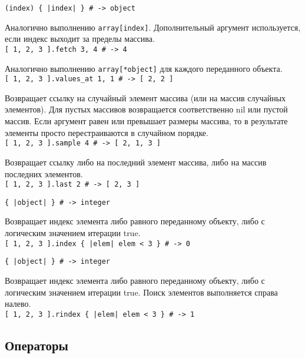 \begin{methodlist}
  \verb!(index) { |index| } # -> object!

  Аналогично выполнению \verb!array[index]!. Дополнительный аргумент используется, если индекс выходит за пределы массива.
  \\\verb![ 1, 2, 3 ].fetch 3, 4 # -> 4!

  Аналогично выполнению \verb!array[*object]! для каждого переданного объекта.
  \\\verb![ 1, 2, 3 ].values_at 1, 1 # -> [ 2, 2 ]!

  Возвращает ссылку на случайный элемент массива (или на массив случайных элементов). Для пустых массивов возвращается соответственно nil или пустой массив. Если аргумент равен или превышает размеры массива, то в результате элементы просто перестраиваются в случайном порядке.
  \\\verb![ 1, 2, 3 ].sample 4 # -> [ 2, 1, 3 ]!

  Возвращает ссылку либо на последний элемент массива, либо на массив последних элементов.
  \\\verb![ 1, 2, 3 ].last 2 # -> [ 2, 3 ]!

  \verb!{ |object| } # -> integer!

  Возвращает индекс элемента либо равного переданному объекту, либо с логическим значением итерации true. 
  \\\verb![ 1, 2, 3 ].index { |elem| elem < 3 } # -> 0!

  \verb!{ |object| } # -> integer!

  Возвращает индекс элемента либо равного переданному объекту, либо с логическим значением итерации true. Поиск элементов выполняется справа налево. 
  \\\verb![ 1, 2, 3 ].rindex { |elem| elem < 3 } # -> 1!
\end{methodlist}

\subsection*{Операторы}


